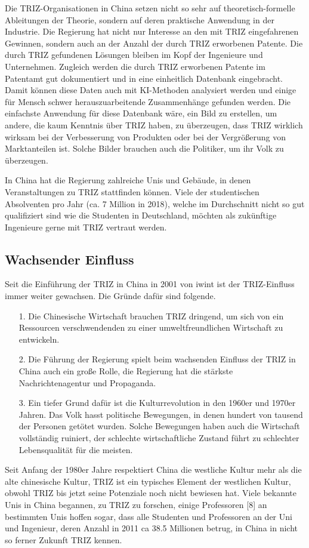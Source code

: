 \documentclass[11pt,a4paper]{article}
\begin{document}
Die TRIZ-Organisationen in China setzen nicht so sehr auf theoretisch-formelle
Ableitungen der Theorie, sondern auf deren praktische Anwendung in der
Industrie.  Die Regierung hat nicht nur Interesse an den mit TRIZ
eingefahrenen Gewinnen, sondern auch an der Anzahl der durch TRIZ erworbenen
Patente. Die durch TRIZ gefundenen Lösungen bleiben im Kopf der Ingenieure und
Unternehmen. Zugleich werden die durch TRIZ erworbenen Patente im Patentamt
gut dokumentiert und in eine einheitlich Datenbank eingebracht. Damit können
diese Daten auch mit KI-Methoden analysiert werden und einige für Mensch
schwer herauszuarbeitende Zusammenhänge gefunden werden. Die einfachste
Anwendung für diese Datenbank wäre, ein Bild zu erstellen, um andere, die kaum
Kenntnis über TRIZ haben, zu überzeugen, dass TRIZ wirklich wirksam bei der
Verbesserung von Produkten oder bei der Vergrößerung von Marktanteilen ist.
Solche Bilder brauchen auch die Politiker, um ihr Volk zu überzeugen.

In China hat die Regierung zahlreiche Unis und Gebäude, in denen
Veranstaltungen zu TRIZ stattfinden können. Viele der studentischen
Absolventen pro Jahr (ca. 7 Million in 2018), welche im Durchschnitt nicht so
gut qualifiziert sind wie die Studenten in Deutschland, möchten als zukünftige
Ingenieure gerne mit TRIZ vertraut werden.
  
\subsection{Wachsender Einfluss}

Seit die Einführung der TRIZ in China in 2001 von iwint ist der TRIZ-Einfluss
immer weiter gewachsen. Die Gründe dafür sind folgende.
\begin{itemize}
\item [1.] Die Chinesische Wirtschaft brauchen TRIZ dringend, um sich von ein
  Ressourcen verschwendenden zu einer umweltfreundlichen Wirtschaft zu
  entwickeln.
\item [2.] Die Führung der Regierung spielt beim wachsenden Einfluss der TRIZ
  in China auch ein große Rolle, die Regierung hat die stärkste
  Nachrichtenagentur und Propaganda.
\item [3.] Ein tiefer Grund dafür ist die Kulturrevolution in den 1960er und
  1970er Jahren. Das Volk hasst politische Bewegungen, in denen hundert von
  tausend der Personen getötet wurden. Solche Bewegungen haben auch die
  Wirtschaft vollständig ruiniert, der schlechte wirtschaftliche Zustand führt
  zu schlechter Lebensqualität für die meisten.
\end{itemize}
Seit Anfang der 1980er Jahre respektiert China die westliche Kultur mehr als
die alte chinesische Kultur, TRIZ ist ein typisches Element der westlichen
Kultur, obwohl TRIZ bis jetzt seine Potenziale noch nicht bewiesen hat. Viele
bekannte Unis in China begannen, zu TRIZ zu forschen, einige Professoren [8]
an bestimmten Unis hoffen sogar, dass alle Studenten und Professoren an der
Uni und Ingenieur, deren Anzahl in 2011 ca 38.5 Millionen betrug, in China in
nicht so ferner Zukunft TRIZ kennen.
\end{document}
